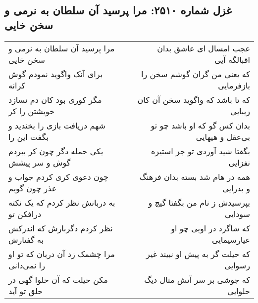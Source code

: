 \begin{center}
\section*{غزل شماره ۲۵۱۰: مرا پرسید آن سلطان به نرمی و سخن خایی}
\label{sec:2510}
\begin{longtable}{l p{0.5cm} r}
مرا پرسید آن سلطان به نرمی و سخن خایی
&&
عجب امسال ای عاشق بدان اقبالگه آیی
\\
برای آنک واگوید نمودم گوش کرانه
&&
که یعنی من گران گوشم سخن را بازفرمایی
\\
مگر کوری بود کان دم نسازد خویشتن را کر
&&
که تا باشد که واگوید سخن آن کان زیبایی
\\
شهم دریافت بازی را بخندید و بگفت این را
&&
بدان کس گو که او باشد چو تو بی‌عقل و هیهایی
\\
یکی حمله دگر چون کر ببردم گوش و سر پیشش
&&
بگفتا شید آوردی تو جز استیزه نفزایی
\\
چون دعوی کری کردم جواب و عذر چون گویم
&&
همه در هام شد بسته بدان فرهنگ و بدرایی
\\
به دربانش نظر کردم که یک نکته درافکن تو
&&
بپرسیدش ز نام من بگفتا گیج و سودایی
\\
نظر کردم دگربارش که اندرکش به گفتارش
&&
که شاگرد در اویی چو او عیارسیمایی
\\
مرا چشمک زد آن دربان که تو او را نمی‌دانی
&&
که حیلت گر به پیش او نبیند غیر رسوایی
\\
مکن حیلت که آن حلوا گهی در حلق تو آید
&&
که جوشی بر سر آتش مثال دیگ حلوایی
\\
\end{longtable}
\end{center}
